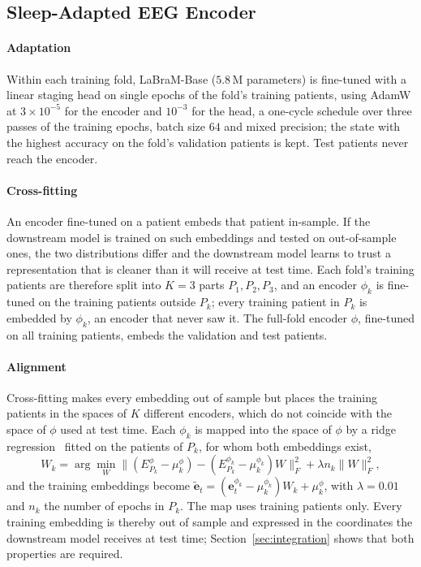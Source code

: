 \documentclass{ieeeaccess}
\begin{document}
\subsection{Sleep-Adapted EEG Encoder}
\label{sec:encoder}
\paragraph{Adaptation} Within each training fold, LaBraM-Base ($5.8$\,M parameters) is
fine-tuned with a linear staging head on single epochs of the fold's training patients, using
AdamW at $3\times10^{-5}$ for the encoder and $10^{-3}$ for the head, a one-cycle schedule
over three passes of the training epochs, batch size $64$ and mixed precision; the state with
the highest accuracy on the fold's validation patients is kept. Test patients never reach the
encoder.

\paragraph{Cross-fitting} An encoder fine-tuned on a patient embeds that patient in-sample. If
the downstream model is trained on such embeddings and tested on out-of-sample ones, the two
distributions differ and the downstream model learns to trust a representation that is
cleaner than it will receive at test time. Each fold's training patients are therefore split
into $K=3$ parts $P_1,P_2,P_3$, and an encoder $\phi_k$ is fine-tuned on the training patients
outside $P_k$; every training patient in $P_k$ is embedded by $\phi_k$, an encoder that never
saw it. The full-fold encoder $\phi$, fine-tuned on all training patients, embeds the
validation and test patients.

\paragraph{Alignment} Cross-fitting makes every embedding out of sample but places the
training patients in the spaces of $K$ different encoders, which do not coincide with the
space of $\phi$ used at test time. Each $\phi_k$ is mapped into the space of $\phi$ by a ridge
regression~\cite{hoerl1970ridge} fitted on the patients of $P_k$, for whom both embeddings
exist,
\begin{equation}
W_k=\arg\min_W\big\lVert(E^{\phi}_{P_k}-\mu^{\phi}_k)-(E^{\phi_k}_{P_k}-\mu^{\phi_k}_k)W\big\rVert_F^2
+\lambda n_k\lVert W\rVert_F^2,
\end{equation}
and the training embeddings become
$\tilde{\mathbf{e}}_t=(\mathbf{e}^{\phi_k}_t-\mu^{\phi_k}_k)W_k+\mu^{\phi}_k$, with $\lambda=0.01$
and $n_k$ the number of epochs in $P_k$. The map uses training patients only. Every training
embedding is thereby out of sample and expressed in the coordinates the downstream model
receives at test time; Section~\ref{sec:integration} shows that both properties are
required.
\end{document}
